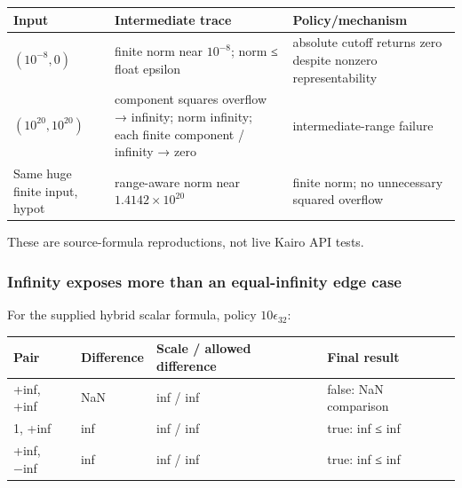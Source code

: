 {\def\LTcaptype{none} %
\begin{longtable}[]{@{}
  >{\raggedright\arraybackslash}p{}
  >{\raggedright\arraybackslash}p{}
  >{\raggedright\arraybackslash}p{}@{}}
\toprule\noalign{}
\begin{minipage}[b]{\linewidth}\raggedright
Input
\end{minipage} & \begin{minipage}[b]{\linewidth}\raggedright
Intermediate trace
\end{minipage} & \begin{minipage}[b]{\linewidth}\raggedright
Policy/mechanism
\end{minipage} \\
\midrule\noalign{}
\endhead
\bottomrule\noalign{}
\endlastfoot
\((10^{-8},0)\) & finite norm near \(10^{-8}\); norm ≤ float epsilon & absolute cutoff returns zero despite nonzero representability \\
\((10^{20},10^{20})\) & component squares overflow → infinity; norm infinity; each finite component / infinity → zero & intermediate-range failure \\
Same huge finite input, hypot & range-aware norm near \(1.4142\times10^{20}\) & finite norm; no unnecessary squared overflow \\
\end{longtable}
}

These are source-formula reproductions, not live Kairo API tests.

\subsubsection{Infinity exposes more than an equal-infinity edge case}\label{appendix-92ff77d4dfdc-infinity-exposes-more-than-an-equal-infinity-edge-case}

\hypertarget{appendix-92ff77d4dfdc-infinity-exposes-more-than-an-equal-infinity-edge-case}{}

For the supplied hybrid scalar formula, policy \(10\epsilon_{32}\):

{\def\LTcaptype{none} %
\begin{longtable}[]{@{}llll@{}}
\toprule\noalign{}
Pair & Difference & Scale / allowed difference & Final result \\
\midrule\noalign{}
\endhead
\bottomrule\noalign{}
\endlastfoot
+inf, +inf & NaN & inf / inf & false: NaN comparison \\
1, +inf & inf & inf / inf & true: inf ≤ inf \\
+inf, −inf & inf & inf / inf & true: inf ≤ inf \\
\end{longtable}
}

